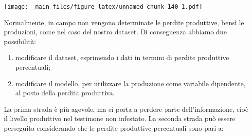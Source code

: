 \documentclass[a4paper,12pt,oneside]{book}
\providecommand{\tightlist}{%
  \setlength{\itemsep}{0pt}\setlength{\parskip}{0pt}}
\newenvironment{Shaded}{\begin{snugshade}}{\end{snugshade}}
\newcommand{\KeywordTok}[1]{\textcolor[rgb]{0.13,0.29,0.53}{\textbf{#1}}}
\newcommand{\DataTypeTok}[1]{\textcolor[rgb]{0.13,0.29,0.53}{#1}}
\newcommand{\DecValTok}[1]{\textcolor[rgb]{0.00,0.00,0.81}{#1}}
\newcommand{\StringTok}[1]{\textcolor[rgb]{0.31,0.60,0.02}{#1}}
\newcommand{\OperatorTok}[1]{\textcolor[rgb]{0.81,0.36,0.00}{\textbf{#1}}}
\newcommand{\NormalTok}[1]{#1}
\theoremstyle{definition}
\theoremstyle{definition}
\theoremstyle{definition}
\theoremstyle{remark}
\begin{document}
\begin{Shaded}
\end{Shaded}

\texttt{[image: \_main\_files/figure-latex/unnamed-chunk-140-1.pdf]}

Normalmente, in campo non vengono determinate le perdite produttive,
bensì le produzioni, come nel caso del nostro dataset. Di conseguenza
abbiamo due possibilità:

\begin{enumerate}
\def\labelenumi{\arabic{enumi}.}
\tightlist
\item
  modificare il dataset, esprimendo i dati in termini di perdite
  produttive percentuali;
\item
  modificare il modello, per utilizzare la produzione come variabile
  dipendente, al posto della perdita produttiva.
\end{enumerate}

La prima strada è più agevole, ma ci porta a perdere parte
dell'informazione, cioè il livello produttivo nel testimone non
infestato. La seconda strada può essere perseguita considerando che le
perdite produttive percentuali sono pari a:
\end{document}
